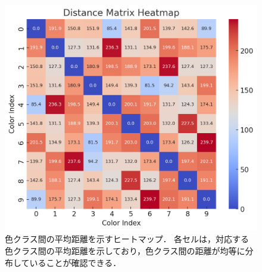 \begin{figure}[H]
    \centering
    \includegraphics[width=\columnwidth]{tables/Distance_Matrix_Heatmap_color.png}
    \caption[色クラス間の平均距離を示すヒートマップ]{
        色クラス間の平均距離を示すヒートマップ．
        各セルは，対応する色クラス間の平均距離を示しており，色クラス間の距離が均等に分布していることが確認できる．
    }
    \label{fig:color_class_distance}
\end{figure}


